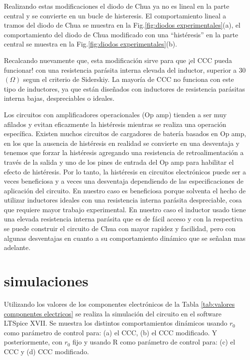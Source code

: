 \documentclass{rbf}
\begin{document}
Realizando estas modificaciones el diodo de Chua ya no es lineal en la parte central y se convierte en un bucle de histeresis. 
El comportamiento lineal a tramos del diodo de Chua se muestra en la Fig.\ref{fig:diodos experimentales}(a), el comportamiento del diodo de Chua modificado con una “histéresis” en la parte central se muestra en la Fig.\ref{fig:diodos experimentales}(b).

Recalcando nuevamente que, esta modificación sirve para que ¡el CCC pueda funcionar! con una resistencia parásita interna elevada del inductor, superior a 30 $(\Omega)$ segun el criterio de Siderskiy. La mayoría de CCC no funciona con este tipo de inductores, ya que están diseñados con inductores de resistencia parásitas interna bajas, despreciables o ideales.

Los circuitos con amplificadores operacionales (Op amp) tienden a ser muy afilados y evitan eficazmente la histéresis mientras se realiza una operación específica. Existen muchos circuitos de cargadores de batería basados en Op amp, en los que la ausencia de histéresis en realidad se convierte en una desventaja y tenemos que forzar la histéresis agregando una resistencia de retroalimentación a través de la salida y uno de los pines de entrada del Op amp para habilitar el efecto de histéresis. Por lo tanto, la histéresis en circuitos electrónicos puede ser a veces beneficiosa y a veces una desventaja dependiendo de las especificaciones de aplicación del circuito. En nuestro caso es beneficiosa porque solventa el hecho de utilizar inductores ideales con una resistencia interna parásita despreciable, cosa que requiere mayor trabajo experimental. En nuestro caso el inductor usado tiene una elevada resistencia interna parásita que es de fácil acceso y con la respectiva se puede construir el circuito de Chua con mayor rapidez y facilidad, pero con algunas desventajas en cuanto a su comportamiento dinámico que se señalan mas adelante.


\section{simulaciones}
Utilizando los valores de los componentes electrónicos de la Tabla \ref{tab:valores componentes electricos} se realiza la simulación del circuito en el software LTSpice XVII. Se muestra los distintos comportamientos dinámicos usando $r_0$ como parámetro de control para: (a) el CCC, (b) el CCC modificado. Y posteriormente, con $r_0$ fijo y usando R como parámetro de control para: (c) el CCC y (d) CCC modificado. 
\end{document}
